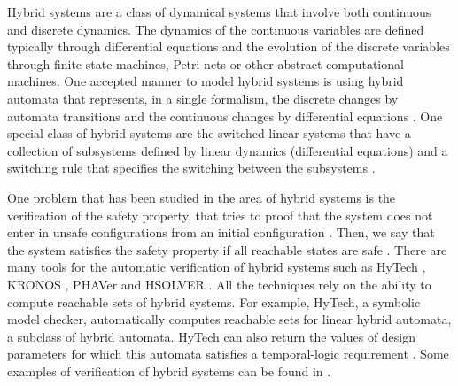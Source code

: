 
Hybrid systems are a class of dynamical systems that involve both
continuous and discrete dynamics. The dynamics of the continuous
variables are defined typically through differential equations and the
evolution of the discrete variables through finite state machines,
Petri nets or other abstract computational machines. One accepted
manner to model hybrid systems is using hybrid automata that
represents, in a single formalism, the discrete changes by automata
transitions and the continuous changes by differential
equations \cite{DeSHee:2009,Henzinger:1997}.  One special class of
hybrid systems are the switched linear systems that have a collection
of subsystems defined by linear dynamics (differential equations) and
a switching rule that specifies the switching between the
subsystems \cite{Sun:2005}.

One problem that has been studied in the area of hybrid systems is the
verification of the safety property, that tries to proof that the
system does not enter in unsafe configurations from an initial
configuration \cite{Tomlin:2003}. Then, we say that the system
satisfies the safety property if all reachable states are
safe \cite{Henzinger:1997}. There are many tools for the automatic
verification of hybrid systems such as HyTech \cite{Henzinger:1997},
KRONOS \cite{Yovine:1997}, PHAVer \cite{Frehse:05} and
HSOLVER \cite{Ratschan:2007}. All the techniques rely on the ability
to compute reachable sets of hybrid systems. For example, HyTech, a
symbolic model checker, automatically computes reachable sets for
linear hybrid automata, a subclass of hybrid automata. HyTech can also
return the values of design parameters for which this automata
satisfies a temporal-logic requirement \cite{Henzinger:1997}. Some
examples of verification of hybrid systems can be found
in \cite{Henzinger:1997,Mohrenschildt:2001}.


